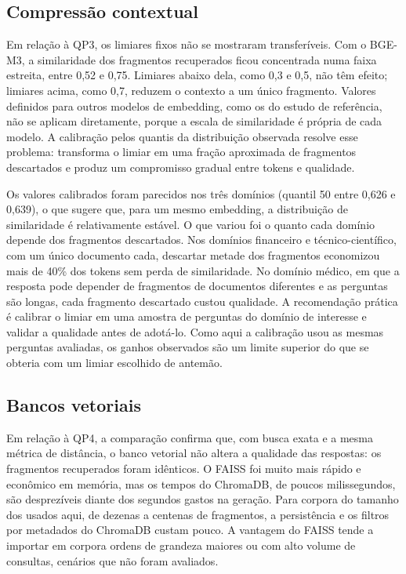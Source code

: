 \subsection{Compressão contextual}

Em relação à QP3, os limiares fixos não se mostraram transferíveis. Com o BGE-M3, a similaridade dos fragmentos recuperados ficou concentrada numa faixa estreita, entre 0,52 e 0,75. Limiares abaixo dela, como 0,3 e 0,5, não têm efeito; limiares acima, como 0,7, reduzem o contexto a um único fragmento. Valores definidos para outros modelos de embedding, como os do estudo de referência, não se aplicam diretamente, porque a escala de similaridade é própria de cada modelo. A calibração pelos quantis da distribuição observada resolve esse problema: transforma o limiar em uma fração aproximada de fragmentos descartados e produz um compromisso gradual entre tokens e qualidade.

Os valores calibrados foram parecidos nos três domínios (quantil 50 entre 0,626 e 0,639), o que sugere que, para um mesmo embedding, a distribuição de similaridade é relativamente estável. O que variou foi o quanto cada domínio depende dos fragmentos descartados. Nos domínios financeiro e técnico-científico, com um único documento cada, descartar metade dos fragmentos economizou mais de 40\% dos tokens sem perda de similaridade. No domínio médico, em que a resposta pode depender de fragmentos de documentos diferentes e as perguntas são longas, cada fragmento descartado custou qualidade. A recomendação prática é calibrar o limiar em uma amostra de perguntas do domínio de interesse e validar a qualidade antes de adotá-lo. Como aqui a calibração usou as mesmas perguntas avaliadas, os ganhos observados são um limite superior do que se obteria com um limiar escolhido de antemão.

\subsection{Bancos vetoriais}

Em relação à QP4, a comparação confirma que, com busca exata e a mesma métrica de distância, o banco vetorial não altera a qualidade das respostas: os fragmentos recuperados foram idênticos. O FAISS foi muito mais rápido e econômico em memória, mas os tempos do ChromaDB, de poucos milissegundos, são desprezíveis diante dos segundos gastos na geração. Para corpora do tamanho dos usados aqui, de dezenas a centenas de fragmentos, a persistência e os filtros por metadados do ChromaDB custam pouco. A vantagem do FAISS tende a importar em corpora ordens de grandeza maiores ou com alto volume de consultas, cenários que não foram avaliados.

